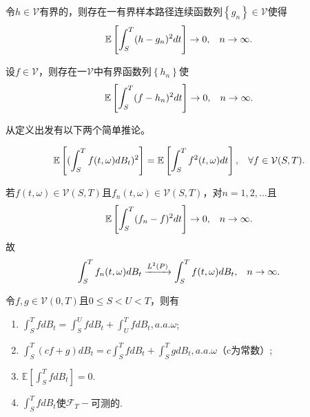 \documentclass[oneside]{sysuthesis}
\begin{document}
\begin{theorem}[从有界样本路径连续函数到有界函数]\label{theo:step2_to_build}
	令$h\in\mathcal{V}$有界的，则存在一有界样本路径连续函数列$\left\{g_n\right\}\in\mathcal{V}$使得
	\[
	\mathbb{E}\left[\int_{S}^{T}(h-g_n)^2dt\right]\to 0,\hspace{0.3cm}n\to\infty.
	\]
\end{theorem}

\begin{theorem}\label{theo:step3_to_build}
	设$f\in\mathcal{V}$，则存在一$\mathcal{V}$中有界函数列$\left\{h_n\right\}$使
	\[
	\mathbb{E}\left[\int_{S}^{T}(f-h_n)^2dt\right]\to 0,\hspace{0.3cm}n\to\infty.
	\]
\end{theorem}

从定义出发有以下两个简单推论。

\begin{corollary}\label{cor:Ito_isometry_general}
	\[
	\mathbb{E}\left[(\int_{S}^{T}f(t,\omega)dB_t)^2\right]=\mathbb{E}\left[\int_{S}^{T}f^2(t,\omega)dt\right],\hspace{0.3cm}\forall f\in\mathcal{V}(S,T).
	\]
\end{corollary}

\begin{corollary}\label{cor:Ito_int_convergency}
	若$f(t,\omega)\in\mathcal{V}(S,T)$且$f_n(t,\omega)\in\mathcal{V}(S,T)$，对$n=1,2,\ldots$且
	\[
	\mathbb{E}\left[\int_{S}^{T}(f_n-f)^2 dt\right]\to 0,\hspace{0.3cm}n\to\infty.
	\]
	故
	\[
	\int_{S}^{T}f_n(t,\omega)dB_t\xrightarrow{L^2(P)}\int_{S}^{T}f(t,\omega)dB_t,\hspace{0.3cm}n\to\infty.
	\]
\end{corollary}

\begin{theorem}[It\^o积分的简单性质]\label{theo:Ito_int_property}
	令$f,g\in\mathcal{V}(0,T)$且$0\le S<U<T$，则有
	\begin{enumerate}[label=(\arabic*)]
		\item $\int_{S}^{T}fdB_t=\int_{S}^{U}fdB_t+\int_{U}^{T}fdB_t,a.a.\omega$;
		\item $\int_{S}^{T}(cf+g)dB_t=c\int_{S}^{T}fdB_t+\int_{S}^{T}gdB_t,a.a.\omega$（c为常数）;
		\item $\mathbb{E}\left[\int_{S}^{T}fdB_t\right]=0$.
		\item $\int_{S}^{T}fdB_t$使$\mathcal{F}_T-$可测的.
	\end{enumerate}
\end{theorem}
\end{document}
